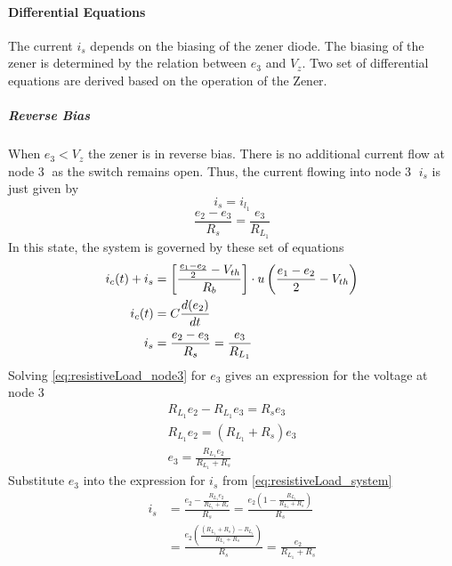 \paragraph{Differential Equations}
The current $i_s$ depends on the biasing of the zener diode. The biasing of the zener is determined by the relation between $e_3$ and $V_z$. Two set of differential equations are derived based on the operation of the Zener.
\subparagraph{Reverse Bias}
When $e_3 < V_z$ the zener is in reverse bias. There is no additional current flow at node \textcircled{3} as the switch remains open. Thus, the current flowing into node \textcircled{3} $i_s$ is just given by $$i_s = i_{l_1}$$
\begin{equation}
	\frac{e_2-e_3}{R_s}=\frac{e_3}{R_{L_1}}
	\label{eq:resistiveLoad_node3}
\end{equation}
In this state, the system is governed by these set of equations
\begin{equation}
	\begin{split}
    	i_c(t) + i_s &= \left[\frac{\frac{e_1 - e_2}{2} - V_{th}}{R_b} \right]\cdot u\left(\frac{e_1 - e_2}{2} - V_{th} \right)\\
    	i_c(t)&=C\frac{d(e_2)}{dt}\\
    	i_s&=\frac{e_2-e_3}{R_s}=\frac{e_3}{R_{L_1}}
	\end{split}
	    \label{eq:resistiveLoad_system}
\end{equation}
Solving \eqref{eq:resistiveLoad_node3} for $e_3$ gives an expression for the voltage at node \textcircled{3}
\begin{equation}
	\begin{split}
		R_{L_1}e_2 - R_{L_1}e_3 = R_s e_3 \\
		R_{L_1}e_2 = (R_{L_1} + R_s)e_3 \\
		e_3 = \frac{R_{L_1}e_2}{R_{L_1} + R_s}
	\end{split}
	\label{eq:resistiveLoad_outputVoltage}
\end{equation}
Substitute $e_3$ into the expression for $i_s$ from \eqref{eq:resistiveLoad_system}
\begin{equation}
	\begin{split}
		i_s &= \frac{e_2 - \frac{R_{L_1}e_2}{R_{L_1} + R_s}}{R_s} 
			= \frac{e_2 (1 - \frac{R_{L_1}}{R_{L_1} + R_s})}{R_s} \\
			&= \frac{e_2 (\frac{(R_{L_1} + R_s) - R_{L_1}}{R_{L_1} + R_s})}{R_s} 
			= \frac{e_2}{R_{L_1} + R_s}
	\end{split}
	\label{eq:resistiveLoad_is}
\end{equation}
